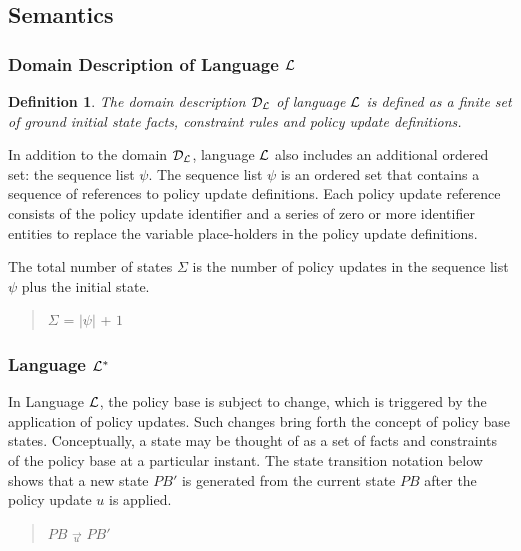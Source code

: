 \documentclass[10pt, twocolumn]{article}
\newtheorem{definition}{Definition}
\begin{document}
    \subsection{Semantics}

      \subsubsection{Domain Description of Language ${\cal L}$}

        \begin{definition}
          The domain description ${\cal D}_{\cal L}$ of language ${\cal L}$ is
          defined as a finite set of ground initial state facts, constraint
          rules and policy update definitions.
        \end{definition}

        In addition to the domain ${\cal D}_{\cal L}$, language ${\cal L}$
        also includes an additional ordered set: the sequence list $\psi$.
        The sequence list $\psi$ is an ordered set that contains a sequence of
        references to policy update definitions. Each policy update reference
        consists of the policy update identifier and a series of zero or more
        identifier entities to replace the variable place-holders in the policy
        update definitions.

        The total number of states $\Sigma$ is the number of policy updates in
        the sequence list $\psi$ plus the initial state.

        \begin{quote}
          $\Sigma$ = $|\psi|$ + $1$
        \end{quote}

      \subsubsection{Language ${\cal L}^{*}$}

        In Language ${\cal L}$, the policy base is subject to change, which is
        triggered by the application of policy updates. Such changes bring
        forth the concept of policy base states. Conceptually, a state may be
        thought of as a set of facts and constraints of the policy base at a
        particular instant. The state transition notation below shows that a
        new state $PB'$ is generated from the current state $PB$ after the
        policy update $u$ is applied.
  
        \begin{quote}
          $PB$ $\overrightarrow{_{u}}$ $PB'$
        \end{quote}
\end{document}
